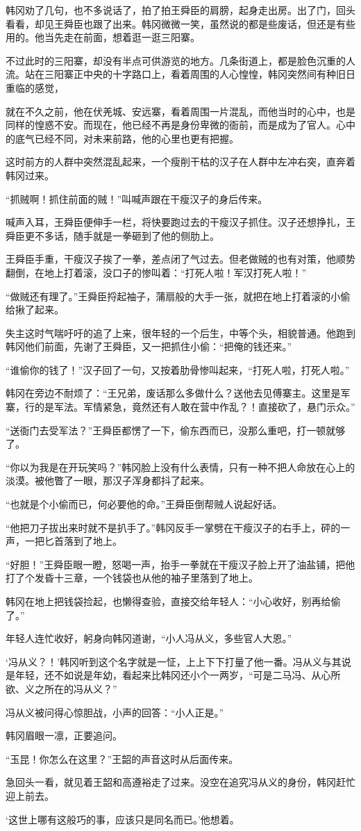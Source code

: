 韩冈劝了几句，也不多说话了，拍了拍王舜臣的肩膀，起身走出房。出了门，回头看看，却见王舜臣也跟了出来。韩冈微微一笑，虽然说的都是些废话，但还是有些用的。他当先走在前面，想着逛一逛三阳寨。

不过此时的三阳寨，却没有半点可供游览的地方。几条街道上，都是脸色沉重的人流。站在三阳寨正中央的十字路口上，看着周围的人心惶惶，韩冈突然间有种旧日重临的感觉，

就在不久之前，他在伏羌城、安远寨，看着周围一片混乱，而他当时的心中，也是同样的惶惑不安。而现在，他已经不再是身份卑微的衙前，而是成为了官人。心中的底气已经不同，对未来前路，他的心里也更有把握。

这时前方的人群中突然混乱起来，一个瘦削干枯的汉子在人群中左冲右突，直奔着韩冈过来。

“抓贼啊！抓住前面的贼！”叫喊声跟在干瘦汉子的身后传来。

喊声入耳，王舜臣便伸手一栏，将快要跑过去的干瘦汉子抓住。汉子还想挣扎，王舜臣更不多话，随手就是一拳砸到了他的侧肋上。

王舜臣手重，干瘦汉子挨了一拳，差点闭了气过去。但老做贼的也有对策，他顺势翻倒，在地上打着滚，没口子的惨叫着：“打死人啦！军汉打死人啦！”

“做贼还有理了。”王舜臣捋起袖子，蒲扇般的大手一张，就把在地上打着滚的小偷给揪了起来。

失主这时气喘吁吁的追了上来，很年轻的一个后生，中等个头，相貌普通。他跑到韩冈他们前面，先谢了王舜臣，又一把抓住小偷：“把俺的钱还来。”

“谁偷你的钱了！”汉子回了一句，又按着肋骨惨叫起来，“打死人啦，打死人啦。”

韩冈在旁边不耐烦了：“王兄弟，废话那么多做什么？送他去见傅寨主。这里是军寨，行的是军法。军情紧急，竟然还有人敢在营中作乱？！直接砍了，悬门示众。”

“送衙门去受军法？”王舜臣都愣了一下，偷东西而已，没那么重吧，打一顿就够了。

“你以为我是在开玩笑吗？”韩冈脸上没有什么表情，只有一种不把人命放在心上的淡漠。被他瞥了一眼，那汉子浑身都抖了起来。

“也就是个小偷而已，何必要他的命。”王舜臣倒帮贼人说起好话。

“他把刀子拔出来时就不是扒手了。”韩冈反手一掌劈在干瘦汉子的右手上，砰的一声，一把匕首落到了地上。

“好胆！”王舜臣眼一瞪，怒喝一声，抬手一拳就在干瘦汉子脸上开了油盐铺，把他打了个发昏十三章，一个钱袋也从他的袖子里落到了地上。

韩冈在地上把钱袋捡起，也懒得查验，直接交给年轻人：“小心收好，别再给偷了。”

年轻人连忙收好，躬身向韩冈道谢，“小人冯从义，多些官人大恩。”

‘冯从义？！’韩冈听到这个名字就是一怔，上上下下打量了他一番。冯从义与其说是年轻，还不如说是年幼，看起来比韩冈还小个一两岁，“可是二马冯、从心所欲、义之所在的冯从义？”

冯从义被问得心惊胆战，小声的回答：“小人正是。”

韩冈眉眼一凛，正要追问。

“玉昆！你怎么在这里？”王韶的声音这时从后面传来。

急回头一看，就见着王韶和高遵裕走了过来。没空在追究冯从义的身份，韩冈赶忙迎上前去。

‘这世上哪有这般巧的事，应该只是同名而已。’他想着。

